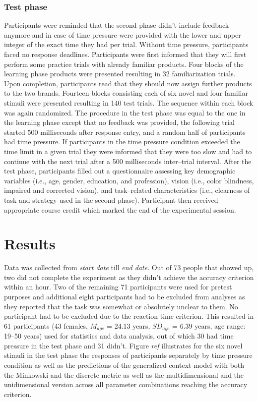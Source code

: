 \documentclass[a4paper,man,natbib]{apa6}
\begin{document}
\subsubsection{Test phase}
Participants were reminded that the second phase didn't include feedback anymore and in case of time pressure were provided with the lower and upper integer of the exact time they had per trial. Without time pressure, participants faced no response deadlines. Participants were first informed that they will first perform some practice trials with already familiar products. Four blocks of the learning phase products were presented resulting in 32 familiarization trials. Upon completion, participants read that they should now assign further products to the two brands. Fourteen blocks consisting each of six novel and four familiar stimuli were presented resulting in 140 test trials. The sequence within each block was again randomized. The procedure in the test phase was equal to the one in the learning phase except that no feedback was provided, the following trial started 500 milliseconds after response entry, and a random half of participants had time pressure. If participants in the time pressure condition exceeded the time limit in a given trial they were informed that they were too slow and had to continue with the next trial after a 500 milliseconds inter--trial interval. After the test phase, participants filled out a questionnaire assessing key demographic variables (i.e., age, gender, education, and profession), vision (i.e., color blindness, impaired and corrected vision), and task--related characteristics (i.e., clearness of task and strategy used in the second phase). Participant then received appropriate course credit which marked the end of the experimental session.

\section{Results}
Data was collected from \textit{start date} till \textit{end date}. Out of 73 people that showed up, two did not complete the experiment as they didn't achieve the accuracy criterion within an hour. Two of the remaining 71 participants were used for pretest purposes and additional eight participants had to be excluded from analyses as they reported that the task was somewhat or absolutely unclear to them. No participant had to be excluded due to the reaction time criterion. This resulted in 61 participants (43 females, $M_{age}$ = 24.13 years, $SD_{age}$ = 6.39 years, age range: 19--50 years) used for statistics and data analysis, out of which 30  had time pressure in the test phase and 31 didn't. Figure \textit{ref} illustrates for the six novel stimuli in the test phase the responses of participants separately by time pressure condition as well as the predictions of the generalized context model with both the Minkowski and the discrete metric as well as the multidimensional and the unidimensional version across all parameter combinations reaching the accuracy criterion.
\end{document}

